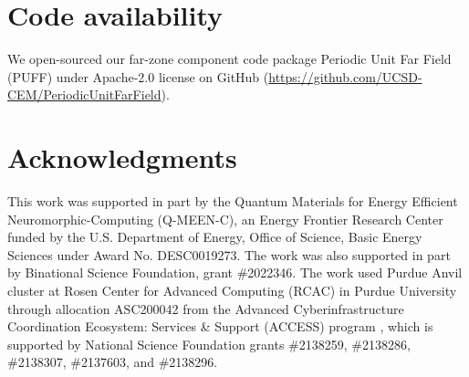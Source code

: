 \documentclass{article}
\begin{document}
\section{Code availability}
We open-sourced our far-zone component code package Periodic Unit Far Field (PUFF) under Apache-2.0 license on GitHub (\url{https://github.com/UCSD-CEM/PeriodicUnitFarField}).

\section{Acknowledgments}
This work was supported in part by the Quantum Materials for Energy Efficient Neuromorphic-Computing (Q-MEEN-C), an Energy Frontier Research Center funded by the U.S. Department of Energy, Office of Science, Basic Energy Sciences under Award No. DESC0019273. The work was also supported in part by Binational Science Foundation, grant \#2022346. The work used Purdue Anvil cluster at Rosen Center for Advanced Computing (RCAC) in Purdue University through allocation ASC200042 from the Advanced Cyberinfrastructure Coordination Ecosystem: Services \& Support (ACCESS) program \cite{10.1145/3569951.3597559}, which is supported by National Science Foundation grants \#2138259, \#2138286, \#2138307, \#2137603, and \#2138296.



\end{document}
